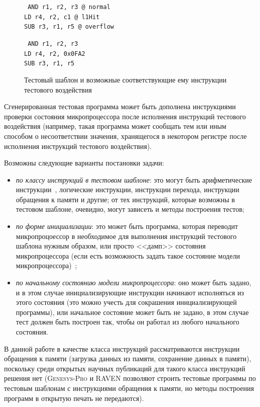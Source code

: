 \begin{figure}[h]
\quad\parbox{0.5\textwidth}{\small \tt
AND r1, r2, r3 @ normal\\
LD r4, r2, c1 @ l1Hit\\
SUB r3, r1, r5 @ overflow } \parbox{0.3\textwidth}{\small \tt
AND r1, r2, r3\\
LD r4, r2, 0x0FA2\\
SUB r3, r1, r5
}
\caption{Тестовый шаблон и возможные соответствующие ему инструкции
тестового воздействия}\label{test_template_exmp}
\end{figure}

Сгенерированная тестовая программа может быть дополнена
инструкциями проверки состояния микропроцессора после исполнения
инструкций тестового воздействия (например, такая программа может сообщать тем или иным способом о несоответствии значения, хранящегося в некотором регистре после исполнения инструкций тестового воздействия).

Возможны следующие варианты постановки задачи:
\begin{itemize}
  \item \emph{по классу инструкций в тестовом шаблоне}: это могут быть арифметические инструкции~\cite{my_syrcose_2008, my_isp_2008}, логические инструкции, инструкции перехода, инструкции обращения к памяти и другие; от тех инструкций, которые возможны в тестовом шаблоне, очевидно, могут зависеть и методы построения тестов;
  \item \emph{по форме инициализации}: это может быть программа, которая переводит микропроцоессор в необходимое для выполнения инструкций тестового шаблона нужным образом, или просто <<дамп>> состояния микропроцессора (если есть возможность задать такое состояние модели микропроцессора)~\cite{my_isp_2009,my_programmirovanie_2009};
  \item \emph{по начальному состоянию модели микропроцессора}: оно может быть задано, и в этом случае инициализирующие инструкции начинают исполняться из этого состояния (это можно учесть для сокрашения инициализирующей программы), или начальное состояние может быть не задано, в этом случае тест должен быть построен так, чтобы он работал из любого начального состояния.
\end{itemize}


В данной работе в качестве класса инструкций рассматриваются инструкции обращения к памяти (загрузка данных из памяти, сохранение данных в памяти), поскольку среди открытых научных публикаций для такого класса инструкций решения нет (\textsc{Genesys-Pro} и \textsc{RAVEN} позволяют строить тестовые программы по тестовым шаблонам с инструкциями обращения к памяти, но методы построения программ в открытую печать не передаются).

